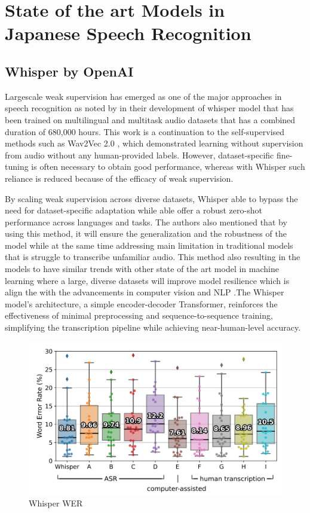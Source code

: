 \section{State of the art Models in Japanese Speech Recognition}
\subsection{Whisper by OpenAI}
Largescale weak supervision has emerged as one of the major approaches in speech recognition as noted by \textcite{radford2023robust} in their development of whisper model that has been trained on multilingual and multitask audio datasets that has a combined duration of 680,000 hours. This work is a continuation to the self-supervised methods such as Wav2Vec 2.0 \parencite{baevski2020wav2vec}, which demonstrated learning without supervision from audio without any human-provided labels. However, dataset-specific fine-tuning is often necessary to obtain good performance, whereas with Whisper such reliance is reduced because of the efficacy of weak supervision. 

By scaling weak supervision across diverse datasets, Whisper able to bypass the need for dataset-specific adaptation while able offer a robust zero-shot performance across languages and tasks. The authors also mentioned that by using this method, it will ensure the generalization and the robustness of the model while at the same time addressing main limitation in traditional models that is struggle to transcribe unfamiliar audio. This method also resulting in the models to have similar trends with other state of the art model in  machine learning where a large, diverse datasets will improve model resilience which is align the with the advancements in computer vision \parencite{kolesnikov2020big} and NLP \parencite{radford2019language}.The Whisper model’s architecture, a simple encoder-decoder Transformer, reinforces the effectiveness of minimal preprocessing and sequence-to-sequence training, simplifying the transcription pipeline while achieving near-human-level accuracy.

\begin{figure}[!ht]
    \centering
    \includegraphics[width=.7\textwidth]{mainmatter//images/image.png}
    \caption{Whisper WER}
\end{figure}

